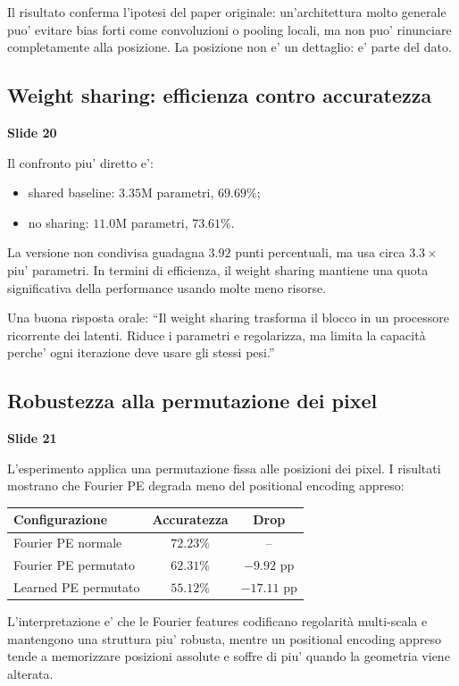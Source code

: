 \documentclass[11pt,a4paper]{article}
\newcommand{\slide}[1]{\textcolor{mainblue}{\textbf{Slide #1}}}
\begin{document}
Il risultato conferma l'ipotesi del paper originale: un'architettura molto
generale puo' evitare bias forti come convoluzioni o pooling locali, ma non puo'
rinunciare completamente alla posizione. La posizione non e' un dettaglio: e'
parte del dato.

\subsection{Weight sharing: efficienza contro accuratezza}
\slide{20}

Il confronto piu' diretto e':
\begin{itemize}
  \item shared baseline: $3.35$M parametri, $69.69\%$;
  \item no sharing: $11.0$M parametri, $73.61\%$.
\end{itemize}
La versione non condivisa guadagna $3.92$ punti percentuali, ma usa circa
$3.3\times$ piu' parametri. In termini di efficienza, il weight sharing
mantiene una quota significativa della performance usando molte meno risorse.

\begin{examBox}
Una buona risposta orale: ``Il weight sharing trasforma il blocco in un
processore ricorrente dei latenti. Riduce i parametri e regolarizza, ma limita
la capacit\`a perche' ogni iterazione deve usare gli stessi pesi.''
\end{examBox}

\subsection{Robustezza alla permutazione dei pixel}
\slide{21}

L'esperimento applica una permutazione fissa alle posizioni dei pixel. I
risultati mostrano che Fourier PE degrada meno del positional encoding appreso:
\begin{center}
\begin{tabular}{lcc}
\toprule
\textbf{Configurazione} & \textbf{Accuratezza} & \textbf{Drop} \\
\midrule
Fourier PE normale & $72.23\%$ & -- \\
Fourier PE permutato & $62.31\%$ & $-9.92$ pp \\
Learned PE permutato & $55.12\%$ & $-17.11$ pp \\
\bottomrule
\end{tabular}
\end{center}

L'interpretazione e' che le Fourier features codificano regolarit\`a
multi-scala e mantengono una struttura piu' robusta, mentre un positional
encoding appreso tende a memorizzare posizioni assolute e soffre di piu' quando
la geometria viene alterata.
\end{document}
